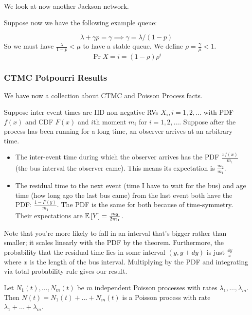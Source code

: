 We look at now another Jackson network.

\begin{example}
    Suppose now we have the following example queue:

    \[ \lambda + \gamma p = \gamma \implies \gamma = \lambda/(1 - p) \]
    So we must have $\frac{\lambda}{1 - p} < \mu$ to have a stable queue. We define $\rho = \frac{\gamma}{\mu} < 1$.
    \[ \Pr{X = i} = ( 1- \rho) \rho^{i} \]
\end{example}

\subsubsection{CTMC Potpourri Results}
We have now a collection about CTMC and Poisson Process facts.

\begin{theorem}
    Suppose inter-event times are IID non-negative RVs $X_i, i = 1, 2, \dots$ with PDF $f(x)$ and CDF $F(x)$ and $i$th moment $m_i$
    for $i = 1, 2, \dots$. Suppose after the process has been running for a long time, an observer arrives at an arbitrary time.
    \begin{itemize}
        \item The inter-event time during which the observer arrives has the PDF $\frac{xf(x)}{m_1}$ (the bus interval the observer came). This means its expectation is $\frac{m_2}{m_1}$.
        
        \item The residual time to the next event (time I have to wait for the bus) and age time
        (how long ago the last bus came) from the last event both have the PDF:
        $\frac{1 - F(y)}{m_1}$.
        The PDF is the same for both because of time-symmetry. Their expectations are $\mathbb{E}\left[ Y \right] = \frac{m_2}{2 m_1}$.
    \end{itemize}

    Note that you're more likely to fall in an interval that's bigger rather than smaller; it scales linearly with the PDF by the theorem.
    Furthermore, the probability that the residual time lies in some interval $(y, y + dy)$ is just $\frac{\dd{y}}{x}$ where $x$ is the length of the bus interval.
    Multiplying by the PDF and integrating via total probability rule gives our result.
\end{theorem}

\begin{theorem}
    Let $N_1(t), \dots, N_m(t)$ be $m$ independent Poisson processes with rates $\lambda_1, \dots, \lambda_m$.
    Then $N(t) = N_1(t) + \dots + N_m(t)$ is a Poisson process with rate $\lambda_1 + \dots + \lambda_m$.
\end{theorem}